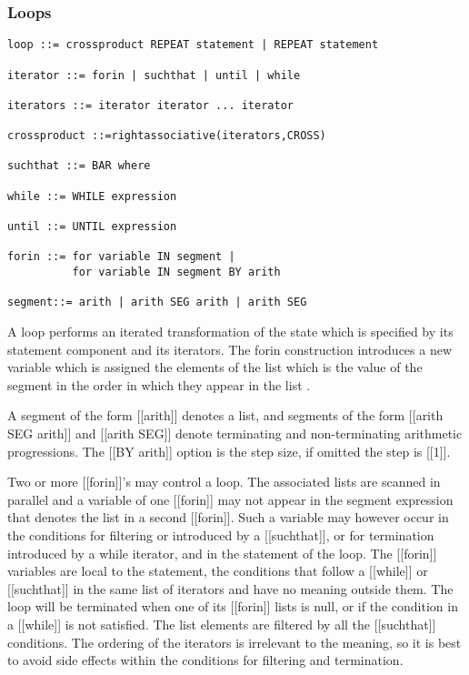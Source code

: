 \documentclass{article}
\begin{document}
\subsubsection{Loops}
\label{sec:boot:iteration}

\begin{verbatim} 
loop ::= crossproduct REPEAT statement | REPEAT statement
 
iterator ::= forin | suchthat | until | while
 
iterators ::= iterator iterator ... iterator
 
crossproduct ::=rightassociative(iterators,CROSS)
 
suchthat ::= BAR where
 
while ::= WHILE expression
 
until ::= UNTIL expression
 
forin ::= for variable IN segment |
          for variable IN segment BY arith
 
segment::= arith | arith SEG arith | arith SEG
\end{verbatim} 

A loop performs an iterated transformation of the state which is
specified by its statement component and its iterators.
The forin construction introduces a new variable which is assigned
the elements of the list which is the value of the segment in the order
in which they appear in the list .
 
A segment of the form [[arith]] denotes a list,
and segments of the form [[arith SEG arith]] and
[[arith SEG]] denote terminating and non-terminating
arithmetic progressions.
The [[BY arith]] option is the step size, if omitted the step is [[1]].
 
Two or more [[forin]]'s may control a loop.
The associated lists are scanned in parallel and
a variable of one [[forin]] may not appear in the segment expression that
denotes the list in a second [[forin]].
Such a variable may however occur in the conditions for filtering or
introduced by a [[suchthat]], or for termination introduced by a
while iterator, and in the statement of the loop.
The [[forin]] variables are local to the statement, the conditions
that follow a [[while]] or [[suchthat]] in the same list of iterators and
have no meaning outside them.
The loop will be terminated when one of its [[forin]] lists is null, or
if the condition in a [[while]] is not satisfied. The list
elements are filtered by all the [[suchthat]] conditions.
The ordering of the iterators is irrelevant to the meaning, so it is
best to avoid side effects within the conditions for filtering and
termination.
 
\end{document}
